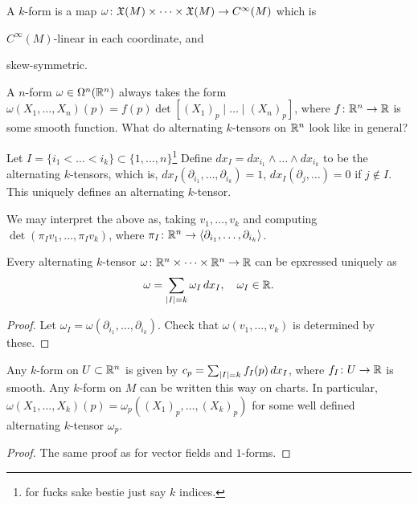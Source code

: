 \begin{definition}[Formal, \S7.20]
    A $k$-form is a map $\omega \colon \mathfrak X(M) \times \dots \times \mathfrak X(M) \to C^\infty(M)$ which is \begin{parlist} $C^\infty(M)$-linear in each coordinate, and \item skew-symmetric. \end{parlist}
\end{definition}
A $n$-form $\omega \in \Omega^n(\mathbb R^n)$ always takes the form $\omega(X_1, \dots, X_n)(p) = f(p) \det [(X_1)_p \mid \dots \mid (X_n)_p]$, where $f \colon \mathbb R^n \to \mathbb R$ is some smooth function. What do alternating $k$-tensors on $\mathbb R^n$ look like in general?
\begin{definition}
    Let $I = \{i_1 < \dots < i_k\} \subset \{1, \dots, n\}$\footnote{for fucks sake bestie just say $k$ indices.} Define $dx_I = dx_{i_1} \wedge \dots \wedge dx_{i_k}$ to be the alternating $k$-tensors, which is, $dx_I(\partial_{i_1}, \dots, \partial_{i_k}) = 1$, $dx_I(\partial_{j}, \dots) = 0$ if $j \notin I$. This uniquely defines an alternating $k$-tensor.
\end{definition}
We may interpret the above as, taking $v_1, \dots, v_k$ and computing $\det(\pi_I v_1, \dots, \pi_I v_k)$, where $\pi_I \colon \mathbb R^n \to \left<\partial_{i_1}, \dots, \partial_{i_k}\right>$.
\begin{lemma}
    Every alternating $k$-tensor $\omega \colon \mathbb R^n \times \dots \times \mathbb R^n \to \mathbb R$ can be epxressed uniquely as
    \[ \omega = \sum_{\left\lvert I \right\rvert = k} \omega_I \, dx_I, \quad \omega_I \in \mathbb R. \]
\end{lemma}
\begin{proof}
    Let $\omega_I = \omega(\partial_{i_1}, \dots, \partial_{i_k})$. Check that $\omega(v_1, \dots, v_k)$ is determined by these.
\end{proof}
\begin{proposition}
    Any $k$-form on $U \subset \mathbb R^n$ is given by $c_p = \sum_{\left\lvert I \right\rvert = k} f_I(p) \, dx_I$, where $f_I \colon U \to \mathbb R$ is smooth. Any $k$-form on $M$ can be written this way on charts. In particular, $\omega(X_1, \dots, X_k)(p) = \omega_p((X_1)_p, \dots, (X_k)_p)$ for some well defined alternating $k$-tensor $\omega_p$.
\end{proposition}
\begin{proof}
    The same proof as for vector fields and $1$-forms.
\end{proof}